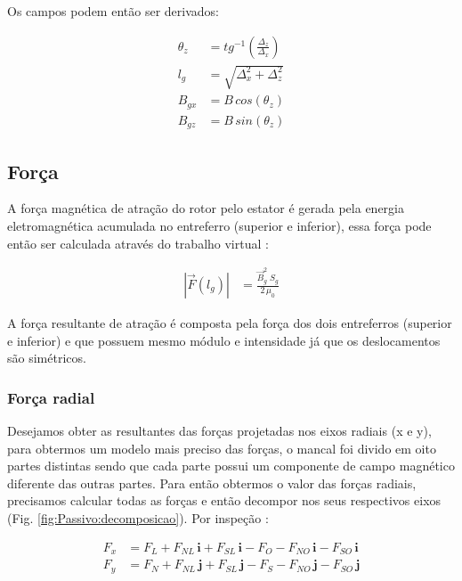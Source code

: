  Os campos podem então ser derivados:
 
 \begin{align}
 	\theta_z &= tg^{-1}(\frac{\Delta_z}{\Delta_x}) \\
 	l_g &= \sqrt{\Delta_x^2 + \Delta_z^2} \\
 	B_{gx} &= B \, cos(\theta_z) \\
 	B_{gz} &= B \, sin(\theta_z) 
 \end{align}


\subsection{Força}

A força magnética de atração do rotor pelo estator é gerada pela energia eletromagnética acumulada no entreferro (superior e inferior), essa força pode então ser calculada através do trabalho virtual \citep{Chiba}:

\begin{align}
	|\vec{F}(l_g)| &=  \frac{ \vec{B}_{g}^2 \; S_g}{2 \, \mu_0} \label{eq:passivo:Fx}
\end{align}

A força resultante de atração é composta pela força dos dois entreferros (superior e inferior) e que possuem mesmo módulo e intensidade já que os deslocamentos são simétricos. 

\subsubsection{Força radial} \label{subsection:forca:x}


Desejamos obter as resultantes das forças projetadas nos eixos radiais (x e y), para obtermos um modelo mais preciso das forças, o mancal foi divido em oito partes distintas sendo que cada parte possui um componente de campo magnético diferente das outras partes. Para então obtermos o valor das forças radiais, precisamos calcular todas as forças e então decompor nos seus respectivos eixos (Fig. \ref{fig:Passivo:decomposicao}). Por inspeção :

\begin{align}
	F_x &= F_{L} + F_{NL} \, \boldsymbol{i} + F_{SL} \, \boldsymbol{i} - F_{O} - F_{NO} \, \boldsymbol{i}  - F_{SO} \, \boldsymbol{i} \label{eq:p:F:resultante:x} \\
	F_y &= F_{N} + F_{NL} \, \boldsymbol{j} + F_{SL} \, \boldsymbol{j} - F_{S} - F_{NO} \, \boldsymbol{j}  - F_{SO} \, \boldsymbol{j}
	\label{eq:p:F:resultante:y} 
\end{align}

